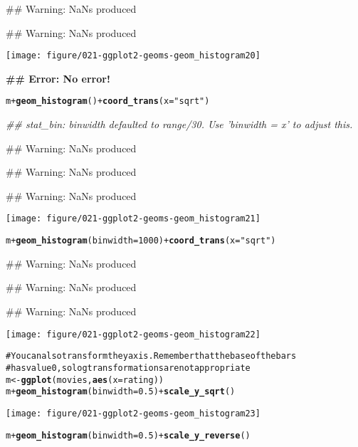 \documentclass[a4paper,titlepage]{tufte-handout}\usepackage{graphicx, color}
\makeatletter
\def\maxwidth{ %
  \ifdim\Gin@nat@width>\linewidth
    \linewidth
  \else
    \Gin@nat@width
  \fi
}
\newcommand{\hlfunctioncall}[1]{\textcolor[rgb]{0.501960784313725,0,0.329411764705882}{\textbf{#1}}}%
\newcommand{\hlstring}[1]{\textcolor[rgb]{0.6,0.6,1}{#1}}%
\newcommand{\hlcomment}[1]{\textcolor[rgb]{0.180392156862745,0.6,0.341176470588235}{#1}}%
\newenvironment{kframe}{%
 \def\at@end@of@kframe{}%
 \ifinner\ifhmode%
  \def\at@end@of@kframe{\end{minipage}}%
  \begin{minipage}{\columnwidth}%
 \fi\fi%
 \def\FrameCommand##1{\hskip\@totalleftmargin \hskip-\fboxsep
 \colorbox{shadecolor}{##1}\hskip-\fboxsep
     \hskip-\linewidth \hskip-\@totalleftmargin \hskip\columnwidth}%
 \MakeFramed {\advance\hsize-\width
   \@totalleftmargin\z@ \linewidth\hsize
   \@setminipage}}%
 {\par\unskip\endMakeFramed%
 \at@end@of@kframe}
\newenvironment{knitrout}{}{} %
\makeatother
\begin{document}
\begin{knitrout}
\begin{kframe}
{\ttfamily\noindent\textcolor{warningcolor}{\#\# Warning: NaNs produced}}

{\ttfamily\noindent\textcolor{warningcolor}{\#\# Warning: NaNs produced}}\end{kframe}\texttt{[image: figure/021-ggplot2-geoms-geom\_histogram20]} \begin{kframe}

{\ttfamily\noindent\bfseries\textcolor{errorcolor}{\#\# Error: No error!}}\begin{alltt}
m + \hlfunctioncall{geom_histogram}() + \hlfunctioncall{coord_trans}(x = \hlstring{"sqrt"})
\end{alltt}


{\ttfamily\noindent\itshape\textcolor{messagecolor}{\#\# stat\_bin: binwidth defaulted to range/30. Use 'binwidth = x' to adjust this.}}

{\ttfamily\noindent\textcolor{warningcolor}{\#\# Warning: NaNs produced}}

{\ttfamily\noindent\textcolor{warningcolor}{\#\# Warning: NaNs produced}}

{\ttfamily\noindent\textcolor{warningcolor}{\#\# Warning: NaNs produced}}\end{kframe}\texttt{[image: figure/021-ggplot2-geoms-geom\_histogram21]} \begin{kframe}\begin{alltt}
m + \hlfunctioncall{geom_histogram}(binwidth=1000) + \hlfunctioncall{coord_trans}(x = \hlstring{"sqrt"})
\end{alltt}


{\ttfamily\noindent\textcolor{warningcolor}{\#\# Warning: NaNs produced}}

{\ttfamily\noindent\textcolor{warningcolor}{\#\# Warning: NaNs produced}}

{\ttfamily\noindent\textcolor{warningcolor}{\#\# Warning: NaNs produced}}\end{kframe}\texttt{[image: figure/021-ggplot2-geoms-geom\_histogram22]} \begin{kframe}\begin{alltt}
\hlcomment{# You can also transform the y axis.  Remember that the base of the bars}
\hlcomment{# has value 0, so log transformations are not appropriate}
m <- \hlfunctioncall{ggplot}(movies, \hlfunctioncall{aes}(x = rating))
m + \hlfunctioncall{geom_histogram}(binwidth = 0.5) + \hlfunctioncall{scale_y_sqrt}()
\end{alltt}
\end{kframe}\texttt{[image: figure/021-ggplot2-geoms-geom\_histogram23]} \begin{kframe}\begin{alltt}
m + \hlfunctioncall{geom_histogram}(binwidth = 0.5) + \hlfunctioncall{scale_y_reverse}()
\end{alltt}



\end{kframe}
\end{knitrout}
\end{document}
